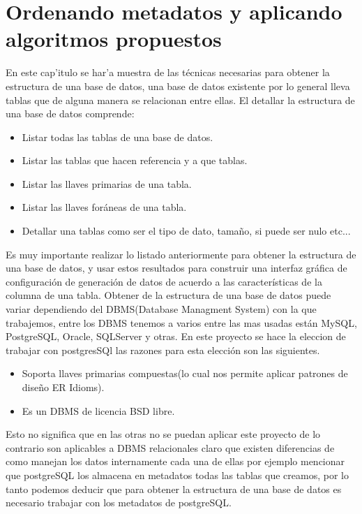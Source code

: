 \chapter{Ordenando metadatos y aplicando algoritmos propuestos}

En este cap'itulo se har'a muestra de las t\'ecnicas necesarias para obtener la estructura de una base de datos, una base de datos existente por lo general lleva tablas que de alguna manera se relacionan entre ellas. El detallar la estructura de una base de datos comprende:
\begin{itemize}
\item Listar todas las tablas de una base de datos.
\item Listar las tablas que hacen referencia y a que tablas.
\item Listar las llaves primarias de una tabla.
\item Listar las llaves for\'aneas de una tabla.
\item Detallar una tablas como ser el tipo de dato, tama\~no, si puede ser nulo etc... 
\end{itemize} 
Es muy importante realizar lo listado anteriormente para obtener la estructura de una base de datos, y usar estos resultados para construir una interfaz gr\'afica de configuraci\'on de generaci\'on de datos de acuerdo a las caracter\'isticas de la columna de una tabla.
Obtener de la estructura de una base de datos puede variar dependiendo del DBMS(Database Managment System) con la que trabajemos, entre los DBMS tenemos a varios entre las mas usadas est\'an MySQL, PostgreSQL, Oracle, SQLServer y otras. En este proyecto se hace la eleccion de  trabajar con postgresSQl las razones para esta elecci\'on son las siguientes.
\begin{itemize}
\item Soporta llaves primarias compuestas(lo cual nos permite aplicar patrones de dise\~no ER Idioms).
\item Es un DBMS de licencia BSD libre.
\end{itemize}
Esto no significa que en las otras no se puedan aplicar este proyecto de lo contrario son aplicables a DBMS relacionales claro que existen diferencias de como manejan los datos internamente cada una de ellas por ejemplo mencionar que postgreSQL los almacena en metadatos todas las tablas que creamos, por lo tanto podemos deducir que para obtener la estructura de una base de datos es necesario trabajar con los metadatos de postgreSQL.
